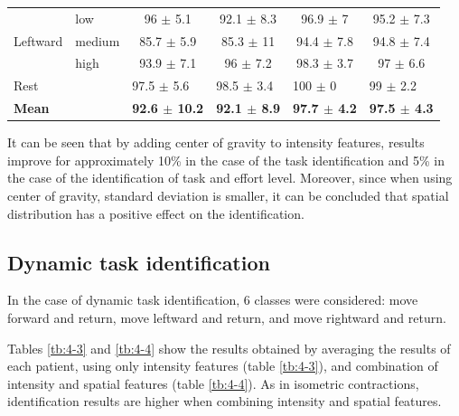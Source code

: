 \begin{table}[]
\begin{tabular}{llcccc}
              & low            & 96 $\pm$ 5.1                                  & 92.1 $\pm$ 8.3                               & 96.9 $\pm$ 7                                & 95.2 $\pm$ 7.3                              \\
Leftward      & medium         & 85.7 $\pm$ 5.9                                & 85.3 $\pm$ 11                                & 94.4 $\pm$ 7.8                              & 94.8 $\pm$ 7.4                              \\
              & high           & 93.9 $\pm$ 7.1                                & 96 $\pm$ 7.2                                 & 98.3 $\pm$ 3.7                              & 97 $\pm$ 6.6                                \\ \hline
Rest          &                & \multicolumn{1}{l}{97.5 $\pm$ 5.6}            & \multicolumn{1}{l}{98.5 $\pm$ 3.4}           & \multicolumn{1}{l}{100 $\pm$ 0}             & \multicolumn{1}{l}{99 $\pm$ 2.2}            \\
\textbf{Mean} & \textbf{}      & \multicolumn{1}{l}{\textbf{92.6  $\pm$ 10.2}} & \multicolumn{1}{l}{\textbf{92.1  $\pm$ 8.9}} & \multicolumn{1}{l}{\textbf{97.7 $\pm$ 4.2}} & \multicolumn{1}{l}{\textbf{97.5 $\pm$ 4.3}}
\end{tabular}
\end{table}

It can be seen that by adding center of gravity to intensity features, results improve for approximately 10\% in the case of the task identification and 5\% in the case of the identification of task and effort level. Moreover, since when using center of gravity, standard deviation is smaller, it can be concluded that spatial distribution has a positive effect on the identification.


\subsection{Dynamic task identification}
In the case of dynamic task identification, 6 classes were considered: move forward and return, move leftward and return, and move rightward and return.

Tables \ref{tb:4-3} and \ref{tb:4-4} show the results obtained by averaging the results of each patient, using only intensity features (table \ref{tb:4-3}), and combination of intensity and spatial features (table \ref{tb:4-4}). As in isometric contractions, identification results are higher when combining intensity and spatial features.


